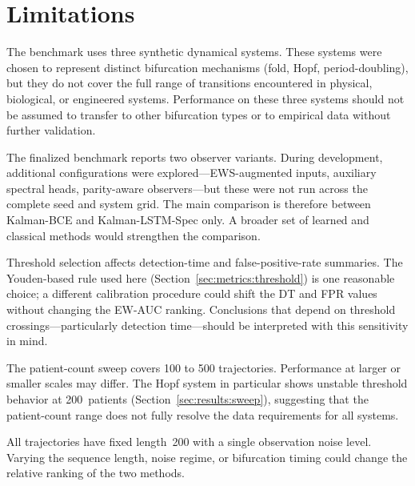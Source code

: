 \section{Limitations}
\label{sec:limitations}

The benchmark uses three synthetic dynamical systems. These systems were chosen
to represent distinct bifurcation mechanisms (fold, Hopf, period-doubling), but
they do not cover the full range of transitions encountered in physical,
biological, or engineered systems. Performance on these three systems should not
be assumed to transfer to other bifurcation types or to empirical data without
further validation.

The finalized benchmark reports two observer variants. During development,
additional configurations were explored---EWS-augmented inputs, auxiliary
spectral heads, parity-aware observers---but these were not run across the
complete seed and system grid. The main comparison is therefore between
Kalman-BCE and Kalman-LSTM-Spec only. A broader set of learned and classical
methods would strengthen the comparison.

Threshold selection affects detection-time and false-positive-rate summaries.
The Youden-based rule used here (Section~\ref{sec:metrics:threshold}) is one
reasonable choice; a different calibration procedure could shift the DT and FPR
values without changing the EW-AUC ranking. Conclusions that depend on threshold
crossings---particularly detection time---should be interpreted with this
sensitivity in mind.

The patient-count sweep covers 100 to 500 trajectories. Performance at larger
or smaller scales may differ. The Hopf system in particular shows unstable
threshold behavior at 200~patients (Section~\ref{sec:results:sweep}),
suggesting that the patient-count range does not fully resolve the data
requirements for all systems.

All trajectories have fixed length~200 with a single observation noise level.
Varying the sequence length, noise regime, or bifurcation timing could change
the relative ranking of the two methods.

